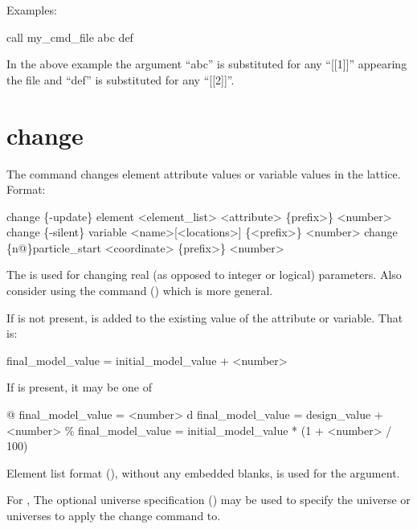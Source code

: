 Examples:
\begin{example}
    call my_cmd_file abc def 
\end{example}
In the above example the argument ``abc'' is substituted for any ``[[1]]'' appearing the
file and ``def'' is substituted for any ``[[2]]''.  \Newline

\section{change}
\label{s:change}

The  command changes element attribute values or variable values in the
 lattice. Format:
\begin{example}
  change \{-update\} element <element_list> <attribute> \{prefix>\} <number>
  change \{-silent\} variable <name>[<locations>] \{<prefix>\} <number>
  change  \{n@\}particle_start <coordinate> \{prefix>\} <number>
\end{example}

\vskip 10pt 

The  is used for changing real (as opposed to integer or logical)
parameters. Also consider using the  command () which is more general.

If  is not present,  is added to the existing value
of the attribute or variable. That is:
\begin{example}
  final_model_value = initial_model_value + <number>
\end{example}
If  is present, it may be one of
\begin{example}
  @       final_model_value = <number>
  d       final_model_value = design_value + <number>
  \%       final_model_value = initial_model_value * (1 + <number> / 100)
\end{example}

Element list format (), without any embedded blanks, is used for
the  argument.

For , The optional  universe specification
() may be used to specify the universe or universes to apply the change
command to.

